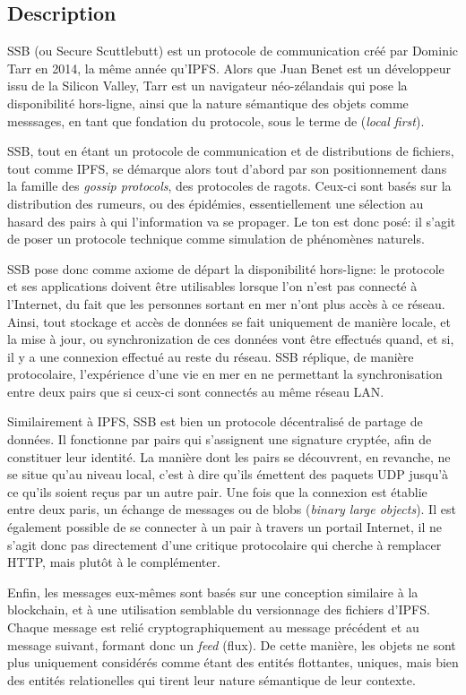 \documentclass{article}
\begin{document}
\subsection{Description}

SSB (ou Secure Scuttlebutt) est un protocole de communication créé par Dominic Tarr en 2014, la même année qu'IPFS. Alors que Juan Benet est un développeur issu de la Silicon Valley, Tarr est un navigateur néo-zélandais qui pose la disponibilité hors-ligne, ainsi que la nature sémantique des objets comme messsages, en tant que fondation du protocole, sous le terme de (\emph{local first}).

SSB, tout en étant un protocole de communication et de distributions de fichiers, tout comme IPFS, se démarque alors tout d'abord par son positionnement dans la famille des \emph{gossip protocols}, des protocoles de ragots. Ceux-ci sont basés sur la distribution des rumeurs, ou des épidémies, essentiellement une sélection au hasard des pairs à qui l'information va se propager. Le ton est donc posé: il s'agit de poser un protocole technique comme simulation de phénomènes naturels.

SSB pose donc comme axiome de départ la disponibilité hors-ligne: le protocole et ses applications doivent être utilisables lorsque l'on n'est pas connecté à l'Internet, du fait que les personnes sortant en mer n'ont plus accès à ce réseau. Ainsi, tout stockage et accès de données se fait uniquement de manière locale, et la mise à jour, ou synchronization de ces données vont être effectués quand, et si, il y a une connexion effectué au reste du réseau. SSB réplique, de manière protocolaire, l'expérience d'une vie en mer en ne permettant la synchronisation entre deux pairs que si ceux-ci sont connectés au même réseau LAN.

Similairement à IPFS, SSB est bien un protocole décentralisé de partage de données. Il fonctionne par pairs qui s'assignent une signature cryptée, afin de constituer leur identité. La manière dont les pairs se découvrent, en revanche, ne se situe qu'au niveau local, c'est à dire qu'ils émettent des paquets UDP jusqu'à ce qu'ils soient reçus par un autre pair. Une fois que la connexion est établie entre deux paris, un échange de messages ou de blobs (\emph{binary large objects}). Il est également possible de se connecter à un pair à travers un portail Internet, il ne s'agit donc pas directement d'une critique protocolaire qui cherche à remplacer HTTP, mais plutôt à le complémenter.

Enfin, les messages eux-mêmes sont basés sur une conception similaire à la blockchain, et à une utilisation semblable du versionnage des fichiers d'IPFS. Chaque message est relié cryptographiquement au message précédent et au message suivant, formant donc un \emph{feed} (flux). De cette manière, les objets ne sont plus uniquement considérés comme étant des entités flottantes, uniques, mais bien des entités relationelles qui tirent leur nature sémantique de leur contexte.
\end{document}
